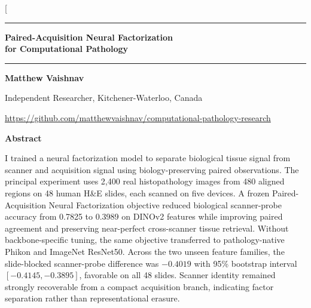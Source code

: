 \documentclass[10pt]{article}
\begin{document}
\raggedright
\twocolumn[{
\begin{center}
\rule{\textwidth}{1.35pt}
\vspace{0.12in}

{\LARGE\bfseries Paired-Acquisition Neural Factorization\\
for Computational Pathology\par}

\vspace{0.10in}
\rule{\textwidth}{0.50pt}
\vspace{0.14in}

{\bfseries Matthew Vaishnav}\par
Independent Researcher, Kitchener-Waterloo, Canada\par
\url{https://github.com/matthewvaishnav/computational-pathology-research}
\end{center}

\vspace{0.05in}
\begin{center}
\begin{minipage}{0.90\textwidth}
\begin{center}\bfseries Abstract\end{center}
\small
I trained a neural factorization model to separate biological tissue signal from scanner and acquisition signal using biology-preserving paired observations. The principal experiment uses 2,400 real histopathology images from 480 aligned regions on 48 human H\&E slides, each scanned on five devices. A frozen Paired-Acquisition Neural Factorization objective reduced biological scanner-probe accuracy from 0.7825 to 0.3989 on DINOv2 features while improving paired agreement and preserving near-perfect cross-scanner tissue retrieval. Without backbone-specific tuning, the same objective transferred to pathology-native Phikon and ImageNet ResNet50. Across the two unseen feature families, the slide-blocked scanner-probe difference was $-0.4019$ with 95\% bootstrap interval $[-0.4145,-0.3895]$, favorable on all 48 slides. Scanner identity remained strongly recoverable from a compact acquisition branch, indicating factor separation rather than representational erasure.


\end{minipage}
\end{center}}
\end{document}

